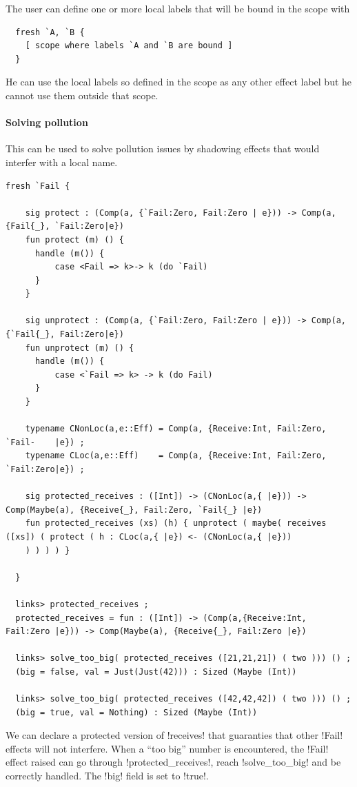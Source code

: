 \documentclass[11pt, nonacm=true, language=french, language=english]{acmart}
\begin{document}
The user can define one or more local labels that will be bound in the scope with
\begin{lstlisting}
  fresh `A, `B {
    [ scope where labels `A and `B are bound ]
  }
\end{lstlisting}

He can use the local labels so defined in the scope as any other effect label but he cannot use them outside that scope.

\paragraph{Solving pollution}
This can be used to solve pollution issues by shadowing effects that would interfer with a local name.

\begin{lstlisting}[caption=Using local effects to avoid pollution]
  fresh `Fail {

    sig protect : (Comp(a, {`Fail:Zero, Fail:Zero | e})) -> Comp(a, {Fail{_}, `Fail:Zero|e})
    fun protect (m) () {
      handle (m()) {
          case <Fail => k>-> k (do `Fail)
      }
    }

    sig unprotect : (Comp(a, {`Fail:Zero, Fail:Zero | e})) -> Comp(a, {`Fail{_}, Fail:Zero|e})
    fun unprotect (m) () {
      handle (m()) {
          case <`Fail => k> -> k (do Fail)
      }
    }

    typename CNonLoc(a,e::Eff) = Comp(a, {Receive:Int, Fail:Zero, `Fail-    |e}) ;
    typename CLoc(a,e::Eff)    = Comp(a, {Receive:Int, Fail:Zero, `Fail:Zero|e}) ;

    sig protected_receives : ([Int]) -> (CNonLoc(a,{ |e})) -> Comp(Maybe(a), {Receive{_}, Fail:Zero, `Fail{_} |e})
    fun protected_receives (xs) (h) { unprotect ( maybe( receives ([xs]) ( protect ( h : CLoc(a,{ |e}) <- (CNonLoc(a,{ |e}))
    ) ) ) ) }

  }

  links> protected_receives ;
  protected_receives = fun : ([Int]) -> (Comp(a,{Receive:Int, Fail:Zero |e})) -> Comp(Maybe(a), {Receive{_}, Fail:Zero |e})

  links> solve_too_big( protected_receives ([21,21,21]) ( two ))) () ;
  (big = false, val = Just(Just(42))) : Sized (Maybe (Int))

  links> solve_too_big( protected_receives ([42,42,42]) ( two ))) () ;
  (big = true, val = Nothing) : Sized (Maybe (Int))
\end{lstlisting}

We can declare a protected version of !receives! that guaranties that other !Fail! effects will not interfere. When a ``too big'' number is encountered, the !Fail! effect raised can go through !protected_receives!, reach !solve_too_big!  and be correctly handled. The !big! field is set to !true!.
\end{document}
